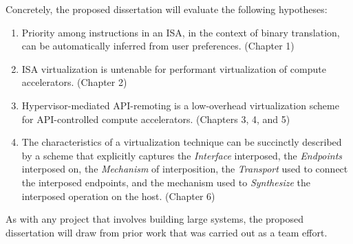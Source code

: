 \noindent Concretely, the proposed dissertation will evaluate the following
hypotheses:
\begin{enumerate}[noitemsep, topsep=0pt, leftmargin=1em, labelwidth=*, align=left, label=\textbf{H \arabic*:}]
\item Priority among instructions in an ISA, in the context of binary
translation, can be automatically inferred from user preferences. (Chapter 1)
\item ISA virtualization is untenable for performant virtualization of compute
accelerators. (Chapter 2)
\item Hypervisor-mediated API-remoting is a low-overhead virtualization scheme
for API-controlled compute accelerators. (Chapters 3, 4, and 5)
\item The characteristics of a virtualization technique can be succinctly
described by a scheme that explicitly captures the \textit{Interface}
interposed, the \textit{Endpoints} interposed on, the \textit{Mechanism} of
interposition, the \textit{Transport} used to connect the interposed
endpoints, and the mechanism used to \textit{Synthesize} the interposed
operation on the host. (Chapter 6)
\end{enumerate}

As with any project that involves building large systems, the proposed
dissertation will draw from prior work that was carried out as a team effort.